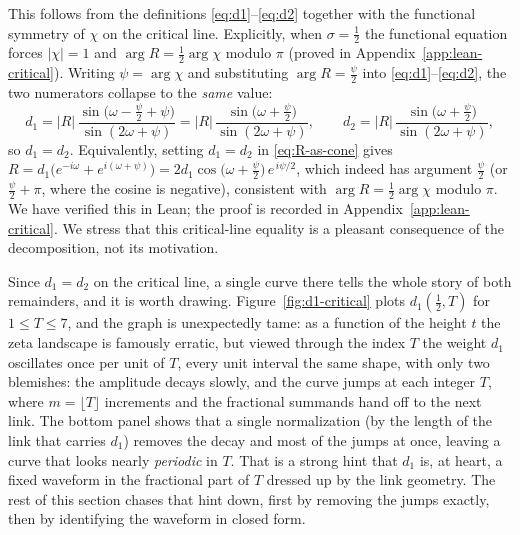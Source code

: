 \documentclass[11pt]{article}
\theoremstyle{definition}
\begin{document}
This follows from the definitions \eqref{eq:d1}--\eqref{eq:d2} together with the
functional symmetry of $\chi$ on the critical line. Explicitly, when
$\sigma=\tfrac12$ the functional equation forces $|\chi|=1$ and
$\arg R = \tfrac12\arg\chi$ modulo $\pi$ (proved in
Appendix~\ref{app:lean-critical}). Writing $\psi=\arg\chi$ and
substituting $\arg R = \tfrac{\psi}{2}$ into \eqref{eq:d1}--\eqref{eq:d2}, the two
numerators collapse to the \emph{same} value:
\begin{equation}
d_1 = |R|\,\frac{\sin\!\bigl(\omega - \tfrac{\psi}{2} + \psi\bigr)}{\sin(2\omega+\psi)}
    = |R|\,\frac{\sin\!\bigl(\omega + \tfrac{\psi}{2}\bigr)}{\sin(2\omega+\psi)},
\qquad
d_2 = |R|\,\frac{\sin\!\bigl(\omega + \tfrac{\psi}{2}\bigr)}{\sin(2\omega+\psi)},
\end{equation}
so $d_1 = d_2$. Equivalently, setting $d_1=d_2$ in \eqref{eq:R-as-cone} gives
$R = d_1\bigl(e^{-i\omega}+e^{i(\omega+\psi)}\bigr)
   = 2d_1\cos\!\bigl(\omega+\tfrac{\psi}{2}\bigr)\,e^{\,i\psi/2}$,
which indeed has argument $\tfrac{\psi}{2}$ (or $\tfrac{\psi}{2}+\pi$, where the
cosine is negative), consistent with $\arg R=\tfrac12\arg\chi$ modulo $\pi$. We
have verified this in Lean; the proof is recorded in
Appendix~\ref{app:lean-critical}. We stress that this critical-line equality is a pleasant
consequence of the decomposition, not its motivation.

Since $d_1=d_2$ on the critical line, a single curve there tells the whole
story of both remainders, and it is worth drawing. Figure~\ref{fig:d1-critical}
plots $d_1(\tfrac12,T)$ for $1\le T\le7$, and the graph is unexpectedly
tame: as a function of the height $t$ the zeta landscape is famously erratic,
but viewed through the index $T$ the weight $d_1$ oscillates once per unit of
$T$, every unit interval the same shape, with only two blemishes: the
amplitude decays slowly, and the curve jumps at each integer $T$, where
$m=\lfloor T\rfloor$ increments and the fractional summands hand off to the
next link. The bottom panel shows that a single normalization (by the length
of the link that carries $d_1$) removes the decay and most of the jumps at
once, leaving a curve that looks nearly \emph{periodic} in $T$. That is a
strong hint that $d_1$ is, at heart, a fixed waveform in the fractional part
of $T$ dressed up by the link geometry. The rest of this section chases that
hint down, first by removing the jumps exactly, then by identifying the
waveform in closed form.
\end{document}
